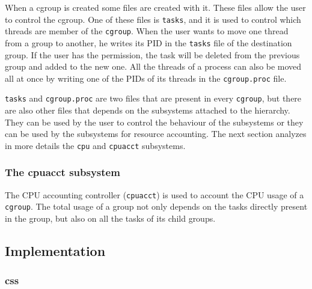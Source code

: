 When a cgroup is created some files are created with it. These files allow the user to control the cgroup. One of these files is \verb|tasks|, and it is used to control which threads are member of the \verb|cgroup|. When the user wants to move one thread from a group to another, he writes its PID in the \verb|tasks| file of the destination group. If the user has the permission, the task will be deleted from the previous group and added to the new one. All the threads of a process can also be moved all at once by writing one of the PIDs of its threads in the \verb|cgroup.proc| file. 

\verb|tasks| and \verb|cgroup.proc| are two files that are present in every \verb|cgroup|, but there are also other files that depends on the subsystems attached to the hierarchy. They can be used by the user to control the behaviour of the subsystems or they can be used by the subsystems for resource accounting.  The next section analyzes in more details the \verb|cpu| and \verb|cpuacct| subsystems.

\subsubsection{The cpuacct subsystem}

The CPU accounting controller (\verb|cpuacct|) is used to account the CPU usage of a \verb|cgroup|. The total usage of a group not only depends on the tasks directly present in the group, but also on all the tasks of its child groups.

\subsection{Implementation}

\subsubsection{css}



